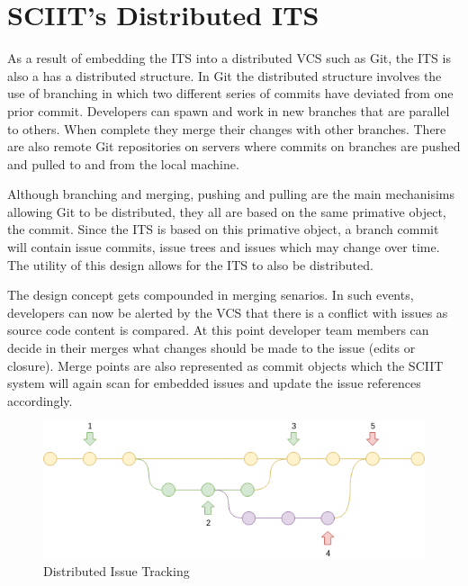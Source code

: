 \documentclass{mproj}
\begin{document}








\section{SCIIT's Distributed ITS}

As a result of embedding the ITS into a distributed VCS such as Git, the ITS is also a has a distributed structure. In Git the distributed structure involves the use of branching in which two different series of commits have deviated from one prior commit. Developers can spawn and work in new branches that are parallel to others. When complete they merge their changes with other branches. There are also remote Git repositories on servers where commits on branches are pushed and pulled to and from the local machine. 

Although branching and merging, pushing and pulling are the main mechanisims allowing Git to be distributed, they all are based on the same primative object, the commit. Since the ITS is based on this primative object, a branch commit will contain issue commits, issue trees and issues which may change over time. The utility of this design allows for the ITS to also be distributed.

The design concept gets compounded in merging senarios. In such events, developers can now be alerted by the VCS that there is a conflict with issues as source code content is compared. At this point developer team members can decide in their merges what changes should be made to the issue (edits or closure). Merge points are also represented as commit objects which the SCIIT system will again scan for embedded issues and update the issue references accordingly.

\begin{figure}[t]
\caption{Distributed Issue Tracking}
\label{fig:distributed-issue-tracking}
\centering
\includegraphics[width=15cm]{distributed-issue-tracking}
\end{figure}
\end{document}
